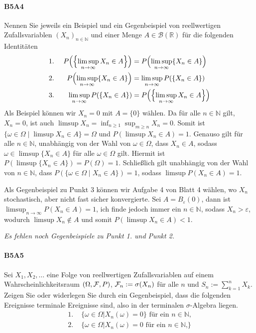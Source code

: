 \documentclass{article}
\begin{document}
\paragraph{B5A4}
Nennen Sie jeweils ein Beispiel und ein Gegenbeispiel von reellwertigen Zufallsvariablen $(X_n)_{n\in\mathbb{N}}$ und einer Menge $A\in\mathcal{B}(\mathbb{R})$ für die folgenden Identitäten
  \begin{alignat*}{2}
&\text{1.~}&P\Bigl(\Bigl\{\limsup_{n\to\infty}X_n\in A\Bigr\}\Bigr)&=P\Bigl(\limsup_{n\to\infty}\{X_n\in A\}\Bigr)\\
&\text{2.~}&P\Bigl(\limsup_{n\to\infty}\{X_n\in A\}\Bigr)&=\limsup_{n\to\infty}P(\{X_n\in A\})\\
&\text{3.~}&\limsup_{n\to\infty}P(\{X_n\in A\})&=P\Bigl(\Bigl\{\limsup_{n\to\infty}X_n\in A\Bigr\}\Bigr)
\end{alignat*}
Als Beispiel können wir $X_n=0$ mit $A=\{0\}$ wählen.
Da für alle $n\in\mathbb{N}$ gilt, $X_n=0$, ist auch $\limsup X_n=\inf_{n\geq1}\sup_{m\geq n} X_n=0$.
Somit ist $\{\omega\in\Omega\mid\limsup X_n\in A\}=\Omega$ und $P(\limsup X_n\in A)=1$.
Genauso gilt für alle $n\in\mathbb{N}$, unabhängig von der Wahl von $\omega\in\Omega$, dass $X_n\in A$, sodass $\omega\in\limsup\{ X_n\in A\}$ für alle $\omega\in\Omega$ gilt.
Hiermit ist $P(\limsup\{X_n\in A\})=P(\Omega)=1$.
Schließlich gilt unabhängig von der Wahl von $n\in\mathbb{N}$, dass $P(\{\omega\in\Omega\mid X_n\in A\})=1$, sodass
$\limsup P(X_n\in A)=1$.

Als Gegenbeispiel zu Punkt 3 können wir Aufgabe 4 von Blatt 4 wählen, wo $X_n$ stochastisch, aber nicht fast sicher konvergierte.
Sei $A=B_\varepsilon(0)$, dann ist $\limsup_{n\to\infty}P(X_n\in A)=1$, ich finde jedoch immer ein $n\in\mathbb{N}$, sodass $X_n>\varepsilon$, wodurch $\limsup X_n\notin A$ und somit $P(\limsup X_n\in A)<1$.

\emph{Es fehlen noch Gegenbeispiele zu Punkt 1. und Punkt 2.}
\newpage

\paragraph{B5A5}
Sei $X_1,X_2,\dots$ eine Folge von reellwertigen Zufallsvariablen auf einem Wahrscheinlichkeitsraum $(\Omega,{\cal F},P)$, ${\cal F}_n:=\sigma(X_n)$ für alle $n$ und $S_n:=\sum_{k=1}^nX_k$.
Zeigen Sie oder widerlegen Sie durch ein Gegenbeispiel, dass die folgenden Ereignisse terminale Ereignisse sind, also in der terminalen $\sigma$-Algebra liegen.
\begin{align*}
  \text{1.~}&\{\omega\in\Omega|X_n(\omega)=0\}\text{ für ein $n\in\mathbb{N}$,}\\
  \text{2.~}&\{\omega\in\Omega|X_n(\omega)=0\text{ für ein $n\in\mathbb{N}$,}\}
\end{align*}
\newpage


\end{document}
